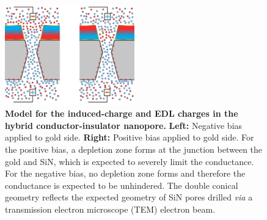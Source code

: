 		\begin{figure}
			\includegraphics[width=0.5\textwidth]{SiN-Gold_Model.png}
			\caption{\textbf{Model for the induced-charge and EDL charges in the hybrid conductor-insulator nanopore.} \textbf{Left:} Negative bias applied to gold side. \textbf{Right:} Positive bias applied to gold side. For the positive bias, a depletion zone forms at the junction between the gold and SiN, which is expected to severely limit the conductance. For the negative bias, no depletion zone forms and therefore the conductance is expected to be unhindered. The double conical geometry reflects the expected geometry of SiN pores drilled \textit{via} a transmission electron microscope (TEM) electron beam.}
			\label{fig:SiNGoldModel}
		\end{figure}

